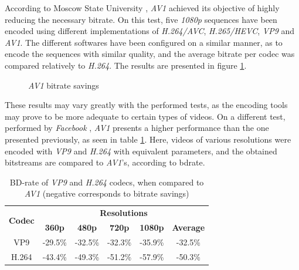 According to Moscow State University \cite{vatolinMSUCodecComparison2019}, \emph{AV1} achieved its objective of highly reducing the necessary bitrate. On this test, five \emph{1080p} sequences have been encoded using different implementations of \emph{H.264/AVC}, \emph{H.265/HEVC}, \emph{VP9} and \emph{AV1}. The different softwares have been configured on a similar manner, as to encode the sequences with similar quality, and the average bitrate per codec was compared relatively to \emph{H.264}. The results are presented in figure \ref{fig:testqual}.

\begin{figure}[!htbp]
    \centering
    
    \caption[\emph{AV1} bitrate savings]{\emph{AV1} bitrate savings \cite{vatolinMSUCodecComparison2019}} 
    \label{fig:testqual}
\end{figure}

These results may vary greatly with the performed tests, as the encoding tools may prove to be more adequate to certain types of videos. On a different test, performed by \emph{Facebook} \cite{AV1BeatsX2642018}, \emph{AV1} presents a higher performance than the one presented previously, as seen in table \ref{tab:facetest}. Here, videos of various resolutions were encoded with \emph{VP9} and \emph{H.264} with equivalent parameters, and the obtained bitstreams are compared to \emph{AV1}'s, according to \gls{bdrate}.

\begin{table}[h]
    \centering
    \begin{tabular}{@{}cccccc@{}} \toprule
        \multirow{2}{*}{\textbf{Codec}}     &      \multicolumn{5}{c}{\textbf{Resolutions}} \\
         & \textbf{360p} & \textbf{480p} & \textbf{720p} & \textbf{1080p} & \textbf{Average}\\ \toprule 
        VP9            &    -29.5\% & -32.5\% & -32.3\% & -35.9\% & -32.5\% \\
        H.264          &    -43.4\% & -49.3\% & -51.2\% & -57.9\% & -50.3\% \\
        \bottomrule
    \end{tabular}
    \caption[BD-rate of \emph{VP9} and \emph{H.264} codecs, when compared to \emph{AV1} (negative corresponds to bitrate savings)]{BD-rate of \emph{VP9} and \emph{H.264} codecs, when compared to \emph{AV1} (negative corresponds to bitrate savings) \cite{AV1BeatsX2642018}}
    \label{tab:facetest}
\end{table}

